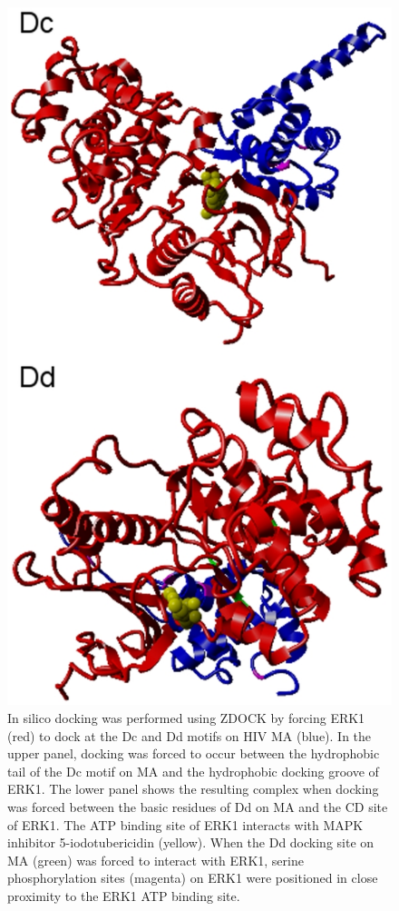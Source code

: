 \begin{figure}
\begin{center}
\includegraphics[scale=0.4]{figs/plos1_5}
\end{center}
\caption[Docking between MAPK ERK1 and HIV MA]{\small In silico docking was
  performed using ZDOCK by forcing ERK1 (red) to dock at the Dc and Dd
  motifs on HIV MA (blue). In the upper panel, docking was forced to
  occur between the hydrophobic tail of the Dc motif on MA and the
  hydrophobic docking groove of ERK1. The lower panel shows the
  resulting complex when docking was forced between the basic residues
  of Dd on MA and the CD site of ERK1. The ATP binding site of ERK1
  interacts with MAPK inhibitor 5-iodotubericidin (yellow). When the
  Dd docking site on MA (green) was forced to interact with ERK1,
  serine phosphorylation sites (magenta) on ERK1 were positioned in
  close proximity to the ERK1 ATP binding
  site.  \label{fig:plos1:fig5}}
\end{figure}

